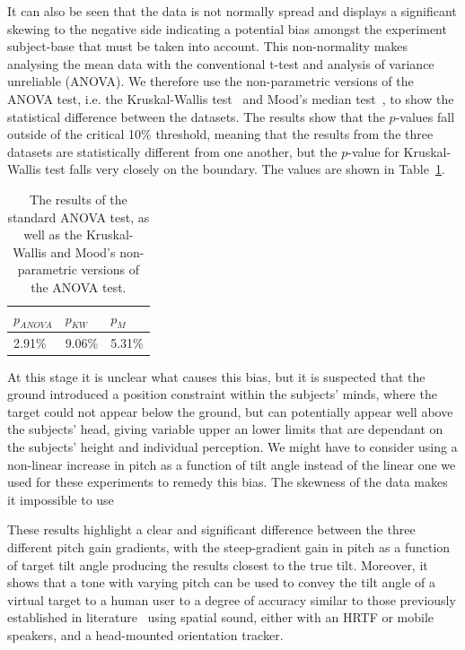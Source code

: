 \documentclass[format=sigconf, review=true, screen=true, anonymous=true]{acmart}
\begin{document}
It can also be seen that the data is not normally spread and displays a significant skewing to the negative side indicating a potential bias amongst the experiment subject-base that must be taken into account. This non-normality makes analysing the mean data with the conventional t-test and analysis of variance unreliable (ANOVA). We therefore use the non-parametric versions of the ANOVA test, i.e. the Kruskal-Wallis test~\cite{kruskal1952use} and Mood's median test~\cite{mood1950introduction}, to show the statistical difference between the datasets. The results show that the $p$-values fall outside of the critical 10\% threshold, meaning that the results from the three datasets are statistically different from one another, but the $p$-value for Kruskal-Wallis test falls very closely on the boundary. The values are shown in Table~\ref{tab:tilt-stats}.

\begin{table}
  \centering
  \caption{The results of the standard ANOVA test, as well as the Kruskal-Wallis and Mood's non-parametric versions of the ANOVA test.}
  \label{tab:tilt-stats}
  \begin{tabular}{|l|l|l|}
    \hline
    $p_{ANOVA}$ & $p_{KW}$ & $p_{M}$ \\\hline
    2.91\% & 9.06\% & 5.31\% \\\hline
  \end{tabular}
\end{table}

At this stage it is unclear what causes this bias, but it is suspected that the ground introduced a position constraint within the subjects' minds, where the target could not appear below the ground, but can potentially appear well above the subjects' head, giving variable upper an lower limits that are dependant on the subjects' height and individual perception. We might have to consider using a non-linear increase in pitch as a function of tilt angle instead of the linear one we used for these experiments to remedy this bias. The skewness of the data makes it impossible to use 

These results highlight a clear and significant difference between the three different pitch gain gradients, with the steep-gradient gain in pitch as a function of target tilt angle producing the results closest to the true tilt. Moreover, it shows that a tone with varying pitch can be used to convey the tilt angle of a virtual target to a human user to a degree of accuracy similar to those previously established in literature~\cite{bujacz2011sonification, katz2011spatial, zotkin2004rendering} using spatial sound, either with an HRTF or mobile speakers, and a head-mounted orientation tracker.
\end{document}
